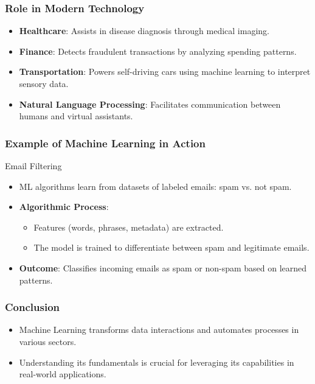 \documentclass[aspectratio=169]{beamer}
\begin{document}
\begin{frame}[fragile]
    \frametitle{Role in Modern Technology}
    \begin{itemize}
        \item \textbf{Healthcare}: Assists in disease diagnosis through medical imaging.
        \item \textbf{Finance}: Detects fraudulent transactions by analyzing spending patterns.
        \item \textbf{Transportation}: Powers self-driving cars using machine learning to interpret sensory data.
        \item \textbf{Natural Language Processing}: Facilitates communication between humans and virtual assistants.
    \end{itemize}
\end{frame}

\begin{frame}[fragile]
    \frametitle{Example of Machine Learning in Action}
    \begin{block}{Email Filtering}
        \begin{itemize}
            \item ML algorithms learn from datasets of labeled emails: spam vs. not spam.
            \item \textbf{Algorithmic Process}:
                \begin{itemize}
                    \item Features (words, phrases, metadata) are extracted.
                    \item The model is trained to differentiate between spam and legitimate emails.
                \end{itemize}
            \item \textbf{Outcome}: Classifies incoming emails as spam or non-spam based on learned patterns.
        \end{itemize}
    \end{block}
\end{frame}

\begin{frame}[fragile]
    \frametitle{Conclusion}
    \begin{itemize}
        \item Machine Learning transforms data interactions and automates processes in various sectors.
        \item Understanding its fundamentals is crucial for leveraging its capabilities in real-world applications.
    \end{itemize}
\end{frame}
\end{document}
